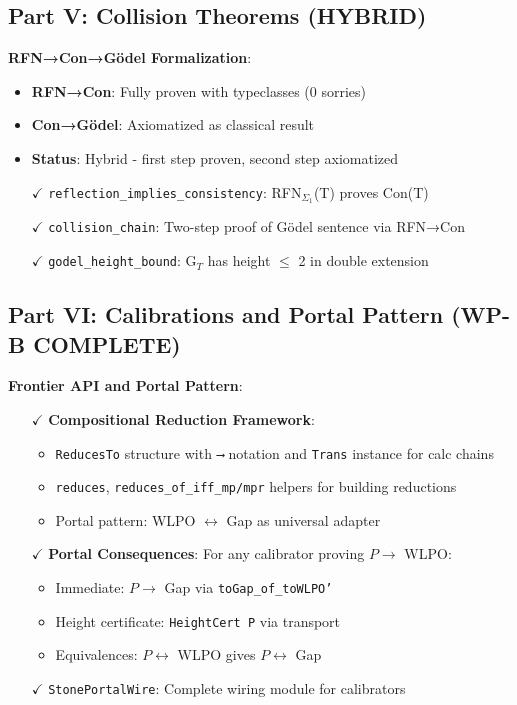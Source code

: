 \documentclass[11pt]{article}
\theoremstyle{definition}
\theoremstyle{remark}
\begin{document}
\subsection{Part V: Collision Theorems (HYBRID)}

\textbf{RFN→Con→Gödel Formalization}:
\begin{itemize}
\item \textbf{RFN→Con}: Fully proven with typeclasses (0 sorries)
\item \textbf{Con→Gödel}: Axiomatized as classical result
\item \textbf{Status}: Hybrid - first step proven, second step axiomatized
\item[$\checkmark$] \texttt{reflection\_implies\_consistency}: RFN$_{\Sigma_1}$(T) proves Con(T) 
\item[$\checkmark$] \texttt{collision\_chain}: Two-step proof of Gödel sentence via RFN→Con
\item[$\checkmark$] \texttt{godel\_height\_bound}: G$_T$ has height $\leq$ 2 in double extension
\end{itemize}

\subsection{Part VI: Calibrations and Portal Pattern (WP-B COMPLETE)}

\textbf{Frontier API and Portal Pattern}:
\begin{itemize}
\item[$\checkmark$] \textbf{Compositional Reduction Framework}:
  \begin{itemize}
  \item \texttt{ReducesTo} structure with \texttt{⟶} notation and \texttt{Trans} instance for calc chains
  \item \texttt{reduces}, \texttt{reduces\_of\_iff\_mp/mpr} helpers for building reductions
  \item Portal pattern: WLPO $\leftrightarrow$ Gap as universal adapter
  \end{itemize}
\item[$\checkmark$] \textbf{Portal Consequences}: For any calibrator proving $P \to$ WLPO:
  \begin{itemize}
  \item Immediate: $P \to$ Gap via \texttt{toGap\_of\_toWLPO'}
  \item Height certificate: \texttt{HeightCert P} via transport
  \item Equivalences: $P \leftrightarrow$ WLPO gives $P \leftrightarrow$ Gap
  \end{itemize}
\item[$\checkmark$] \texttt{StonePortalWire}: Complete wiring module for calibrators
\end{itemize}
\end{document}
